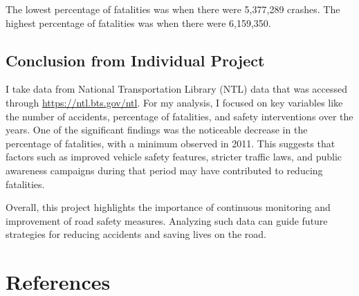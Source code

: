 \documentclass[
  letterpaper,
  DIV=11,
  numbers=noendperiod]{scrreprt}
\newlength{\cslhangindent}
\newenvironment{CSLReferences}[2] %
 {\begin{list}{}{%
  \setlength{\itemindent}{0pt}
  \setlength{\leftmargin}{0pt}
  \setlength{\parsep}{0pt}
  \ifodd #1
   \setlength{\leftmargin}{\cslhangindent}
   \setlength{\itemindent}{-1\cslhangindent}
  \fi
  \setlength{\itemsep}{#2\baselineskip}}}
 {\end{list}}
\begin{document}
The lowest percentage of fatalities was when there were 5,377,289
crashes. The highest percentage of fatalities was when there were
6,159,350.

\section{Conclusion from Individual
Project}\label{conclusion-from-individual-project}

I take data from National Transportation Library (NTL) data that was
accessed through \url{https://ntl.bts.gov/ntl}. For my analysis, I
focused on key variables like the number of accidents, percentage of
fatalities, and safety interventions over the years. One of the
significant findings was the noticeable decrease in the percentage of
fatalities, with a minimum observed in 2011. This suggests that factors
such as improved vehicle safety features, stricter traffic laws, and
public awareness campaigns during that period may have contributed to
reducing fatalities.

Overall, this project highlights the importance of continuous monitoring
and improvement of road safety measures. Analyzing such data can guide
future strategies for reducing accidents and saving lives on the road.


\chapter*{References}\label{references}


\label{refs}
\begin{CSLReferences}{0}{1}
\end{CSLReferences}
\end{document}
